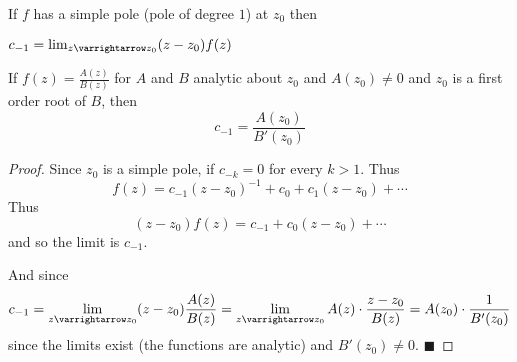 \documentclass[10pt]{article}
\let\to=\varrightarrow
\def\qed{\hskip1cm\hbox{}\hfill$\blacksquare$}
\begin{document}
\begin{prop*}

    If $f$ has a simple pole (pole of degree $1$) at $z_0$ then
    \benum
        \item $c_{-1}=\lim_{z\to z_0}(z-z_0)f(z)$
        \item If $f(z)=\frac{A(z)}{B(z)}$ for $A$ and $B$ analytic about $z_0$ and $A(z_0)\neq0$ and $z_0$ is a first order root of $B$, then
        \[ c_{-1} = \frac{A(z_0)}{B'(z_0)} \]
    \eenum

\end{prop*}

\begin{proof}

    Since $z_0$ is a simple pole, if $c_{-k}=0$ for every $k>1$.
    Thus
    \[ f(z) = c_{-1}(z-z_0)^{-1} + c_0 + c_1(z-z_0) + \cdots \]
    Thus
    \[ (z-z_0)f(z) = c_{-1} + c_0(z-z_0) + \cdots \]
    and so the limit is $c_{-1}$.

    And since
    \[ c_{-1} = \lim_{z\to z_0}(z-z_0)\frac{A(z)}{B(z)} = \lim_{z\to z_0}A(z)\cdot\frac{z-z_0}{B(z)} = A(z_0)\cdot\frac1{B'(z_0)} \]
    since the limits exist (the functions are analytic) and $B'(z_0)\neq0$.
    \qed

\end{proof}
\end{document}

